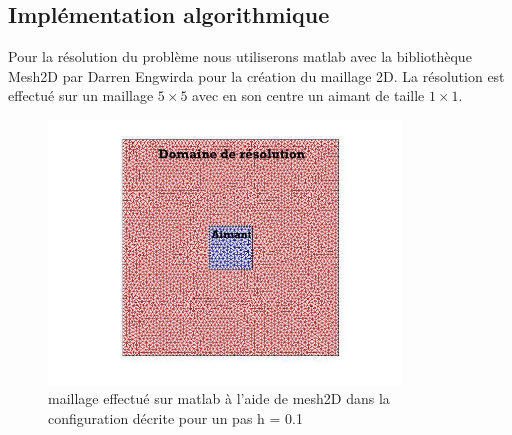 \documentclass[a4paper,12pt,titlepage]{report}
\begin{document}
\begin{onehalfspace}
\subsection{Implémentation algorithmique}

Pour la résolution du problème nous utiliserons matlab avec la bibliothèque Mesh2D par Darren Engwirda pour la création du maillage 2D.
La résolution est effectué sur un maillage $5\times 5$ avec en son centre un aimant de taille $1\times 1$.

\begin{figure}[h]
	\begin{center}
	\includegraphics[height = 7cm, keepaspectratio]{graphes/maillage_resolution_champ_magnetique.jpg} 
	\caption{\label{figure 3 } maillage effectué sur matlab à l'aide de mesh2D dans la configuration décrite pour un pas h = 0.1}
	\end{center}
\end{figure}


\end{onehalfspace}
\end{document}
